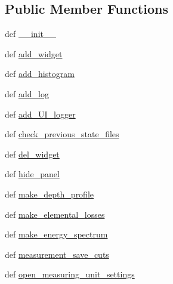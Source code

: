 \subsection*{Public Member Functions}
\begin{DoxyCompactItemize}
\item 
def \hyperlink{classWidgets_1_1MeasurementTabWidget_1_1MeasurementTabWidget_aee8d444727e46c8cced9fbf853419a39}{\-\_\-\-\_\-init\-\_\-\-\_\-}
\item 
def \hyperlink{classWidgets_1_1MeasurementTabWidget_1_1MeasurementTabWidget_aa070662ef900e9907610b36c28c8a490}{add\-\_\-widget}
\item 
def \hyperlink{classWidgets_1_1MeasurementTabWidget_1_1MeasurementTabWidget_a972a6411dbb7ca0f543988a9fbf61674}{add\-\_\-histogram}
\item 
def \hyperlink{classWidgets_1_1MeasurementTabWidget_1_1MeasurementTabWidget_ab12a0b756830705f4109088b33452387}{add\-\_\-log}
\item 
def \hyperlink{classWidgets_1_1MeasurementTabWidget_1_1MeasurementTabWidget_aa40815ca2f4ea199fac48d6c3efea900}{add\-\_\-\-U\-I\-\_\-logger}
\item 
def \hyperlink{classWidgets_1_1MeasurementTabWidget_1_1MeasurementTabWidget_a44ee930bec8552a41159fed591abf317}{check\-\_\-previous\-\_\-state\-\_\-files}
\item 
def \hyperlink{classWidgets_1_1MeasurementTabWidget_1_1MeasurementTabWidget_ab0ffed8501ddb2ca75ab043f5a20540b}{del\-\_\-widget}
\item 
def \hyperlink{classWidgets_1_1MeasurementTabWidget_1_1MeasurementTabWidget_a042148f7e08099d81b6b5886c9332789}{hide\-\_\-panel}
\item 
def \hyperlink{classWidgets_1_1MeasurementTabWidget_1_1MeasurementTabWidget_a51d34b697fe0f0d22cfe3fad148b6c8c}{make\-\_\-depth\-\_\-profile}
\item 
def \hyperlink{classWidgets_1_1MeasurementTabWidget_1_1MeasurementTabWidget_a8e2dfa5263df4845e53013cc345cf042}{make\-\_\-elemental\-\_\-losses}
\item 
def \hyperlink{classWidgets_1_1MeasurementTabWidget_1_1MeasurementTabWidget_a70ab9b1243c4cad761a5784c6e20b9e6}{make\-\_\-energy\-\_\-spectrum}
\item 
def \hyperlink{classWidgets_1_1MeasurementTabWidget_1_1MeasurementTabWidget_ae4adbb3c898d97c74718decf9951e0e3}{measurement\-\_\-save\-\_\-cuts}
\item 
def \hyperlink{classWidgets_1_1MeasurementTabWidget_1_1MeasurementTabWidget_a8fe4a059bd2edc9bf68779245d4371b4}{open\-\_\-measuring\-\_\-unit\-\_\-settings}

\end{DoxyCompactItemize}
